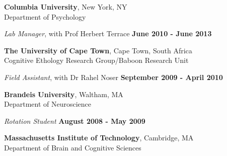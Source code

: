 \documentclass[margin,line]{res}
\begin{document}
\begin{resume}
{\bf Columbia University}, New York, NY \\
Department of Psychology

\vspace{-.2cm}
{\em Lab Manager}, with Prof Herbert  Terrace \hfill {\bf June 2010 - June 2013}\\
\vspace{-.3cm}


\vspace{-.1cm}

{\bf The University of Cape Town}, Cape Town, South Africa \\
Cognitive Ethology Research Group/Baboon Research Unit

\vspace{-.2cm}
{\em Field Assistant}, with Dr Rahel Noser \hfill {\bf September 2009 - April 2010}\\
\vspace{-.3cm}


\vspace{-.1cm}

{\bf Brandeis University}, Waltham, MA \\
Department of Neuroscience

\vspace{-.2cm}
{\em Rotation Student} \hfill {\bf August 2008 - May 2009}\\
\vspace{-.3cm}


\vspace{-.1cm}

{\bf Massachusetts Institute of Technology}, Cambridge, MA \\
Department of Brain and Cognitive Sciences


\end{resume}
\end{document}
